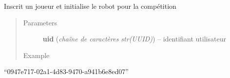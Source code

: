 \documentclass[letterpaper,10pt,english]{sphinxmanual}
\begin{document}
\begin{fulllineitems}
\label{index:graphique_lolipooo.register_pooo}
Inscrit un joueur et initialise le robot pour la compétition
\begin{quote}\begin{description}
\item[{Parameters}] \leavevmode
\textbf{uid} (\emph{chaîne de caractères str(UUID)}) -- identifiant utilisateur

\item[{Example}] \leavevmode
\end{description}\end{quote}

``0947e717-02a1-4d83-9470-a941b6e8ed07''

\end{fulllineitems}

\end{document}
